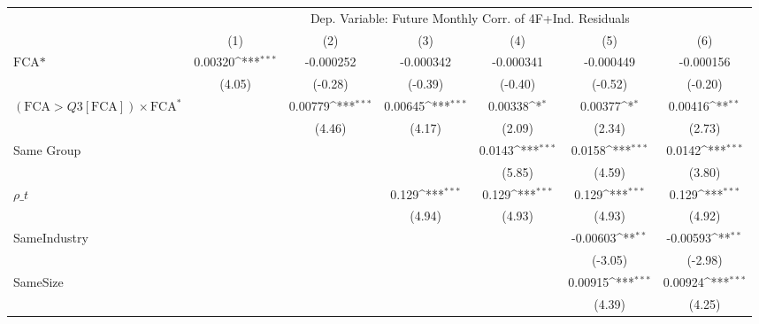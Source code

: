 {
\def\sym#1{\ifmmode^{#1}\else\(^{#1}\)\fi}
\begin{tabular}{l*{6}{c}}
\hline\hline
                &\multicolumn{6}{c}{Dep. Variable: Future Monthly Corr. of 4F+Ind. Residuals}                                     \\\cmidrule(lr){2-7}
                &\multicolumn{1}{c}{(1)}         &\multicolumn{1}{c}{(2)}         &\multicolumn{1}{c}{(3)}         &\multicolumn{1}{c}{(4)}         &\multicolumn{1}{c}{(5)}         &\multicolumn{1}{c}{(6)}         \\
\hline
$ \text{FCA*} $ &  0.00320\sym{***}&-0.000252         &-0.000342         &-0.000341         &-0.000449         &-0.000156         \\
                &   (4.05)         &  (-0.28)         &  (-0.39)         &  (-0.40)         &  (-0.52)         &  (-0.20)         \\
[1em]
 $ (\text{FCA} > Q3[\text{FCA}]) \times {\text{FCA} ^*}  $ &                  &  0.00779\sym{***}&  0.00645\sym{***}&  0.00338\sym{*}  &  0.00377\sym{*}  &  0.00416\sym{**} \\
                &                  &   (4.46)         &   (4.17)         &   (2.09)         &   (2.34)         &   (2.73)         \\
[1em]
Same Group      &                  &                  &                  &   0.0143\sym{***}&   0.0158\sym{***}&   0.0142\sym{***}\\
                &                  &                  &                  &   (5.85)         &   (4.59)         &   (3.80)         \\
[1em]
 $ {\rho\_t} $   &                  &                  &    0.129\sym{***}&    0.129\sym{***}&    0.129\sym{***}&    0.129\sym{***}\\
                &                  &                  &   (4.94)         &   (4.93)         &   (4.93)         &   (4.92)         \\
[1em]
SameIndustry    &                  &                  &                  &                  & -0.00603\sym{**} & -0.00593\sym{**} \\
                &                  &                  &                  &                  &  (-3.05)         &  (-2.98)         \\
[1em]
SameSize        &                  &                  &                  &                  &  0.00915\sym{***}&  0.00924\sym{***}\\
                &                  &                  &                  &                  &   (4.39)         &   (4.25)         \\

\end{tabular}}
